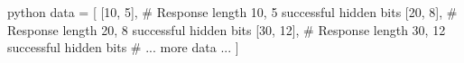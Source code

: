 python
data = [
    [10, 5],  # Response length 10, 5 successful hidden bits
    [20, 8],  # Response length 20, 8 successful hidden bits
    [30, 12], # Response length 30, 12 successful hidden bits
    # ... more data ...
]